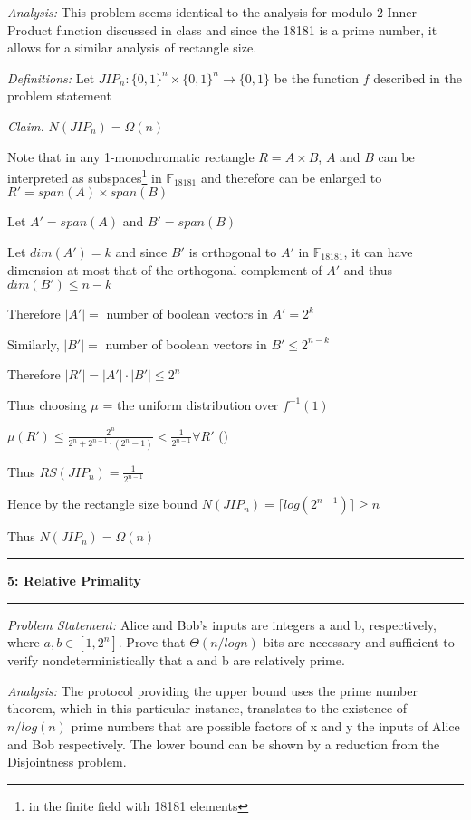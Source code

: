 \documentclass[11pt]{article}
\newcommand\question[2]{\vspace{.25in}\hrule\textbf{#1: #2}\vspace{.5em}\hrule\vspace{.10in}}
\newcommand\analysis{\vspace{.10in}\emph{Analysis: }\newline}
\newcommand\problem{\emph{Problem Statement:}\newline}
\newcommand\definitions{\emph{Definitions:}\newline}
\newcommand\claim{\emph{Claim.}\newline}
\begin{document}
\analysis
This problem seems identical to the analysis for modulo 2 Inner Product function discussed in class and since the 18181 is a prime number, it allows for a similar analysis of rectangle size. 

\definitions
Let $JIP_n: {\{0, 1\}}^n \times {\{0, 1\}}^n \to \{0, 1\}$ be the function $f$ described in the problem statement

\claim
$N(JIP_n) = \Omega(n)$ 

\proof 
Note that in any 1-monochromatic rectangle $R = A \times B$, $A$ and $B$ can be interpreted as subspaces\footnote{in the finite field with 18181 elements} in $\mathbb{F}_{18181}$ and therefore can be enlarged to $R' = span(A) \times span(B)$

Let $A' = span(A)$ and $B' = span(B)$

Let $dim(A') = k$ and since $B'$ is orthogonal to $A'$ in $\mathbb{F}_{18181}$, it can have dimension at most that of the orthogonal complement of $A'$ and thus $dim(B') \leq n - k$

Therefore $\lvert A' \rvert =$ number of boolean vectors in $A' = 2^k$

Similarly, $\lvert B' \rvert =$ number of boolean vectors in $B' \leq 2^{n-k}$

Therefore $\lvert R' \rvert = \lvert A' \rvert \cdot \lvert B' \rvert \leq 2^n$

Thus choosing $\mu$ = the uniform distribution over $f^{-1}(1)$ 

$\mu(R') \leq \frac{2^n}{2^n + 2^{n - 1} \cdot (2^n - 1)} < \frac{1}{2^{n-1}} \forall R'$ ()

Thus $RS(JIP_n) = \frac{1}{2^{n-1}}$

Hence by the rectangle size bound $N(JIP_n) = \lceil log(2^{n-1}) \rceil \geq n$

Thus  $N(JIP_n) = \Omega(n)$

\newpage

\question{5}{Relative Primality}

\problem
Alice and Bob’s inputs are integers a and b, respectively, where $a, b \in [1, 2^n]$. Prove that $\Theta(n/ log n)$ bits are necessary and sufficient to verify nondeterministically that a and b are relatively prime.

\analysis
The protocol providing the upper bound uses the prime number theorem, which in this particular instance, translates to the existence of $n/log(n)$ prime numbers that are possible factors of x and y the inputs of Alice and Bob respectively. The lower bound can be shown by a reduction from the Disjointness problem. 
\end{document}
